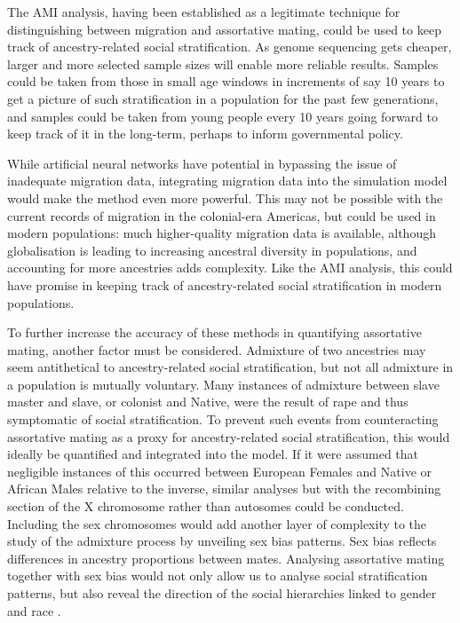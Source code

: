 \documentclass[11pt]{article}
\begin{document}
The AMI analysis, having been established as a legitimate technique for distinguishing between migration and assortative mating, could be used to keep track of ancestry-related social stratification. As genome sequencing gets cheaper, larger and more selected sample sizes will enable more reliable results. Samples could be taken from those in small age windows in increments of say 10 years to get a picture of such stratification in a population for the past few generations, and samples could be taken from young people every 10 years going forward to keep track of it in the long-term, perhaps to inform governmental policy.

While artificial neural networks have potential in bypassing the issue of inadequate migration data, integrating migration data into the simulation model would make the method even more powerful. This may not be possible with the current records of migration in the colonial-era Americas, but could be used in modern populations: much higher-quality migration data is available, although globalisation is leading to increasing ancestral diversity in populations, and accounting for more ancestries adds complexity. Like the AMI analysis, this could have promise in keeping track of ancestry-related social stratification in modern populations.

To further increase the accuracy of these methods in quantifying assortative mating, another factor must be considered. Admixture of two ancestries may seem antithetical to ancestry-related social stratification, but not all admixture in a population is mutually voluntary. Many instances of admixture between slave master and slave, or colonist and Native, were the result of rape and thus symptomatic of social stratification. To prevent such events from counteracting assortative mating as a proxy for ancestry-related social stratification, this would ideally be quantified and integrated into the model. If it were assumed that negligible instances of this occurred between European Females and Native or African Males relative to the inverse, similar analyses but with the recombining section of the X chromosome rather than autosomes could be conducted. Including the sex chromosomes would add another layer of complexity to the study of the admixture process by unveiling sex bias patterns. Sex bias reflects differences in ancestry proportions between mates. Analysing assortative mating together with sex bias would not only allow us to analyse social stratification patterns, but also reveal the direction of the social hierarchies linked to gender and race \parencite{Micheletti2020}.
\end{document}
